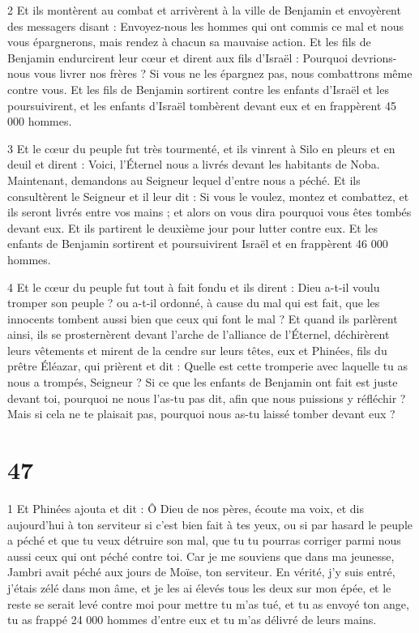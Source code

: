 \par 2 Et ils montèrent au combat et arrivèrent à la ville de Benjamin et envoyèrent des messagers disant : Envoyez-nous les hommes qui ont commis ce mal et nous vous épargnerons, mais rendez à chacun sa mauvaise action. Et les fils de Benjamin endurcirent leur cœur et dirent aux fils d'Israël : Pourquoi devrions-nous vous livrer nos frères ? Si vous ne les épargnez pas, nous combattrons même contre vous. Et les fils de Benjamin sortirent contre les enfants d'Israël et les poursuivirent, et les enfants d'Israël tombèrent devant eux et en frappèrent 45 000 hommes.

\par 3 Et le cœur du peuple fut très tourmenté, et ils vinrent à Silo en pleurs et en deuil et dirent : Voici, l'Éternel nous a livrés devant les habitants de Noba. Maintenant, demandons au Seigneur lequel d'entre nous a péché. Et ils consultèrent le Seigneur et il leur dit : Si vous le voulez, montez et combattez, et ils seront livrés entre vos mains ; et alors on vous dira pourquoi vous êtes tombés devant eux. Et ils partirent le deuxième jour pour lutter contre eux. Et les enfants de Benjamin sortirent et poursuivirent Israël et en frappèrent 46 000 hommes.

\par 4 Et le cœur du peuple fut tout à fait fondu et ils dirent : Dieu a-t-il voulu tromper son peuple ? ou a-t-il ordonné, à cause du mal qui est fait, que les innocents tombent aussi bien que ceux qui font le mal ? Et quand ils parlèrent ainsi, ils se prosternèrent devant l'arche de l'alliance de l'Éternel, déchirèrent leurs vêtements et mirent de la cendre sur leurs têtes, eux et Phinées, fils du prêtre Éléazar, qui prièrent et dit : Quelle est cette tromperie avec laquelle tu as nous a trompés, Seigneur ? Si ce que les enfants de Benjamin ont fait est juste devant toi, pourquoi ne nous l'as-tu pas dit, afin que nous puissions y réfléchir ? Mais si cela ne te plaisait pas, pourquoi nous as-tu laissé tomber devant eux ?



\chapter{47}

\par 1 Et Phinées ajouta et dit : Ô Dieu de nos pères, écoute ma voix, et dis aujourd'hui à ton serviteur si c'est bien fait à tes yeux, ou si par hasard le peuple a péché et que tu veux détruire son mal, que tu tu pourras corriger parmi nous aussi ceux qui ont péché contre toi. Car je me souviens que dans ma jeunesse, Jambri avait péché aux jours de Moïse, ton serviteur. En vérité, j'y suis entré, j'étais zélé dans mon âme, et je les ai élevés tous les deux sur mon épée, et le reste se serait levé contre moi pour mettre tu m'as tué, et tu as envoyé ton ange, tu as frappé 24 000 hommes d'entre eux et tu m'as délivré de leurs mains.

